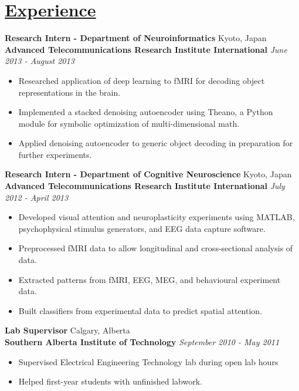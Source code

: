 \documentclass[a4paper, 11pt]{article}
\begin{document}
\section{\underline{Experience}}
  \textbf{Research Intern - Department of Neuroinformatics}
  \hfill
  Kyoto, Japan \\
  \textbf{Advanced Telecommunications Research Institute International}
  \hfill
  \emph{June 2013 - August 2013}
  \begin{itemize}[nosep]
    \item Researched application of deep learning to fMRI for decoding object representations in the brain.
    \item Implemented a stacked denoising autoencoder using Theano, a Python module for symbolic optimization of multi-dimensional math.
    \item Applied denoising autoencoder to generic object decoding in preparation for further experiments.
  \end{itemize}
  \medskip
  
  \textbf{Research Intern - Department of Cognitive Neuroscience}
  \hfill
  Kyoto, Japan\\
  \textbf{Advanced Telecommunications Research Institute International}
  \hfill
  \emph{July 2012 - April 2013}
  \begin{itemize}[nosep]
    \item Developed visual attention and neuroplasticity experiments using MATLAB, psychophysical stimulus generators, and EEG data capture software.
    \item Preprocessed fMRI data to allow longitudinal and cross-sectional analysis of data.
    \item Extracted patterns from fMRI, EEG, MEG, and behavioural experiment data.
    \item Built classifiers from experimental data to predict spatial attention.
  \end{itemize}
  \medskip

  \textbf{Lab Supervisor}
  \hfill
  Calgary, Alberta\\
  \textbf{Southern Alberta Institute of Technology}
  \hfill
  \emph{September 2010 - May 2011}
  \begin{itemize}[nosep]
    \item Supervised Electrical Engineering Technology lab during open lab hours
    \item Helped first-year students with unfinished labwork.
  \end{itemize}
  \medskip
\end{document}
